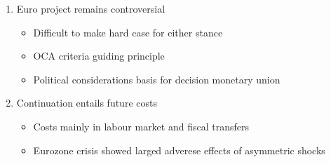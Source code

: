 \documentclass{beamer}
\begin{document}
\begin{frame}
\begin{table}[!h] \centering \caption{Scorecard for the OCA criteria} \label{table:summary}
\end{table}
\end{frame}

\begin{frame}
  \begin{enumerate}
  \item Euro project remains controversial
  \begin{itemize}
    \item Difficult to make hard case for either stance 
    \item OCA criteria guiding principle 
    \item Political considerations basis for decision monetary union
  \end{itemize}
  \medskip
  \item Continuation entails future costs
  \begin{itemize}
    \item Costs mainly in labour market and fiscal transfers
    \item Eurozone crisis showed larged adverese effects of asymmetric shocks
  \end{itemize}
\end{enumerate}
\end{frame}

\end{document}
